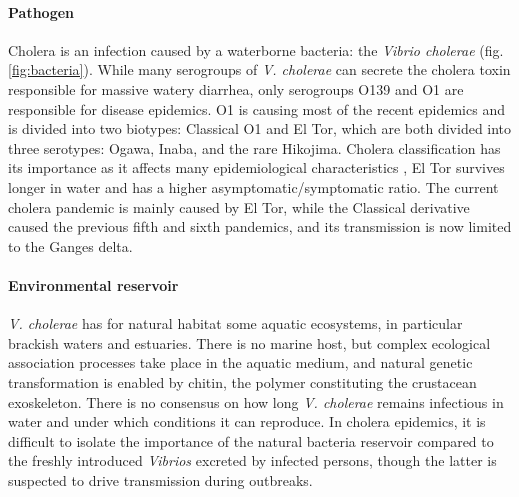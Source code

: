\paragraph{Pathogen} Cholera is an infection caused by a waterborne bacteria: the \emph{Vibrio cholerae} (fig. \ref{fig:bacteria}). While many serogroups of \emph{V. cholerae} can secrete the cholera toxin responsible for massive watery diarrhea, only serogroups O139 and O1 are responsible for disease epidemics. O1 is causing most of the recent epidemics and is divided into two biotypes: Classical O1 and El Tor, which are both divided into three serotypes: Ogawa, Inaba, and the rare Hikojima\cite{Kaper:Cholera:1995}. Cholera classification has its importance as it affects many epidemiological characteristics \eg, El Tor survives longer in water and has a higher asymptomatic/symptomatic ratio\cite{WHO:CholeraVaccinesWHO:2017}. The current cholera pandemic is mainly caused by El Tor, while the Classical derivative caused the previous fifth and sixth pandemics, and its transmission is now limited to the Ganges delta\cite{Nair:CholeraDueAltered:2006, Domman:DefiningEndemicCholera:2018}. 

 \paragraph{Environmental reservoir}  \textit{V. cholerae} has for natural habitat some aquatic ecosystems, in particular brackish waters and estuaries. There is no marine host, but complex ecological association processes take place in the aquatic medium, and natural genetic transformation is enabled by chitin, the polymer constituting the crustacean exoskeleton\cite{Reidl:VibrioCholeraeCholera:2002,Meibom:ChitinInducesNatural:2005}. There is no consensus on how long \textit{V. cholerae} remains infectious in water and under which conditions it can reproduce\cite{Mavian:ToxigenicVibrioCholerae:2020}. In cholera epidemics, it is difficult to isolate the importance of the natural bacteria reservoir compared to the freshly introduced \textit{Vibrios} excreted by infected persons, though the latter is suspected to drive transmission during outbreaks.

